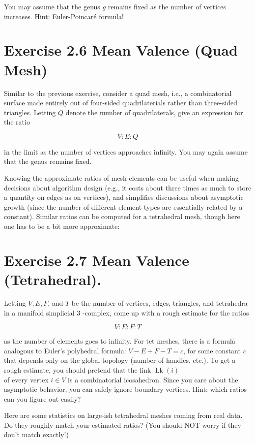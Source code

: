 \documentclass[10pt]{article}
\begin{document}
You may assume that the genus $g$ remains fixed as the number of vertices increases. Hint: Euler-Poincaré formula!

\section*{Exercise 2.6 Mean Valence (Quad Mesh)}
Similar to the previous exercise, consider a quad mesh, i.e., a combinatorial surface made entirely out of four-sided quadrilaterials rather than three-sided triangles. Letting $Q$ denote the number of quadrilaterals, give an expression for the ratio

$$
V: E: Q
$$

in the limit as the number of vertices approaches infinity. You may again assume that the genus remains fixed.

Knowing the approximate ratios of mesh elements can be useful when making decisions about algorithm design (e.g., it costs about three times as much to store a quantity on edges as on vertices), and simplifies discussions about asymptotic growth (since the number of different element types are essentially related by a constant). Similar ratios can be computed for a tetrahedral mesh, though here one has to be a bit more approximate:

\section*{Exercise 2.7 Mean Valence (Tetrahedral).}
Letting $V, E, F$, and $T$ be the number of vertices, edges, triangles, and tetrahedra in a manifold simplicial 3 -complex, come up with a rough estimate for the ratios

$$
V: E: F: T
$$

as the number of elements goes to infinity. For tet meshes, there is a formula analogous to Euler's polyhedral formula: $V-E+F-T=c$, for some constant $c$ that depends only on the global topology (number of handles, etc.). To get a rough estimate, you should pretend that the link $\operatorname{Lk}(i)$\\
of every vertex $i \in V$ is a combinatorial icosahedron. Since you care about the asymptotic behavior, you can safely ignore boundary vertices. Hint: which ratios can you figure out easily?

Here are some statistics on large-ish tetrahedral meshes coming from real data. Do they roughly match your estimated ratios? (You should NOT worry if they don't match exactly!)
\end{document}
